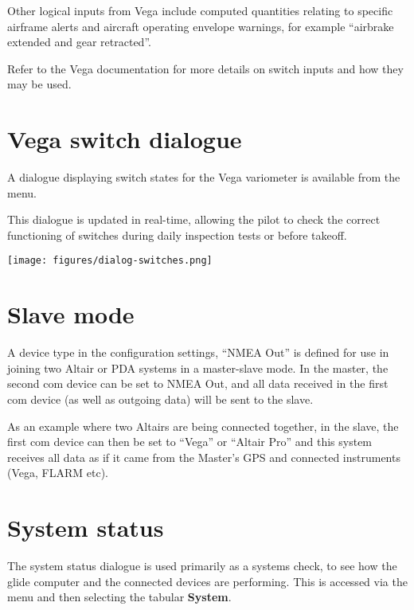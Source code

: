 Other logical inputs from Vega include computed quantities relating to
specific airframe alerts and aircraft operating envelope warnings, for
example ``airbrake extended and gear retracted''.  

Refer to the Vega documentation %
for more details on switch inputs and how they may be used.

\section{Vega switch dialogue}

A dialogue displaying switch states for the Vega variometer
is available from the menu.

This dialogue is updated in real-time, allowing the pilot
to check the correct functioning of switches during daily
inspection tests or before takeoff. 

\begin{center}
\texttt{[image: figures/dialog-switches.png]}
\end{center}

\section{Slave mode}

A device type in the configuration settings, ``NMEA Out'' is defined
for use in joining two Altair or PDA systems in a master-slave mode.
In the master, the second com device can be set to NMEA Out, and all
data received in the first com device (as well as outgoing data) will
be sent to the slave.  

As an example where two Altairs are being connected together, in the
slave, the first com device can then be set to ``Vega'' or ``Altair
Pro'' and this system receives all data as if it came from the
Master's GPS and connected instruments (Vega, FLARM etc).


\section{System status}\label{sec:system-status}

The system status dialogue is
used primarily as a systems check, to see how the glide computer and the 
connected devices are performing.  This is accessed via the menu 
and then selecting the tabular {\bf System}.

